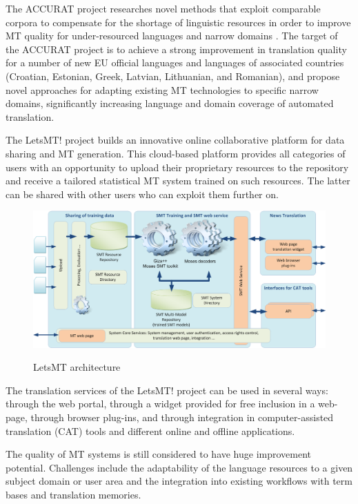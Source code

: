 \begin{multicols}{2}
The ACCURAT project researches novel methods that exploit comparable corpora to compensate for the shortage of linguistic resources in order to improve MT quality for under-resourced languages and narrow domains \cite{Meta32, Meta33}.
The target of the ACCURAT project is to achieve a strong improvement in translation quality for a number of new EU official languages and languages of associated countries (Croatian, Estonian, Greek, Latvian, Lithuanian, and Romanian), and propose novel approaches for adapting existing MT technologies to specific narrow domains, significantly increasing language and domain coverage of automated translation.

The LetsMT! project \cite{Meta34} builds an innovative online collaborative platform for data sharing and MT generation.
This cloud-based platform provides all categories of users with an opportunity to upload their proprietary resources to the repository and receive a tailored statistical MT system trained on such resources.
The latter can be shared with other users who can exploit them further on.

\begin{figure}[htb]
  \center
  \includegraphics[width=\textwidth]{../_media/latvian/LetsMT_architecture_EN}
  \caption{LetsMT architecture}
   \label{fig:LetsMT_architecture_EN}
\end{figure}

The translation services of the LetsMT! project can be used in several ways: through the web portal, through a widget provided for free inclusion in a web-page, through browser plug-ins, and through integration in computer-assisted translation (CAT) tools and different online and offline applications. 

The quality of MT systems is still considered to have huge improvement potential.
Challenges include the adaptability of the language resources to a given subject domain or user area and the integration into existing workflows with term bases and translation memories. 


\end{multicols}
